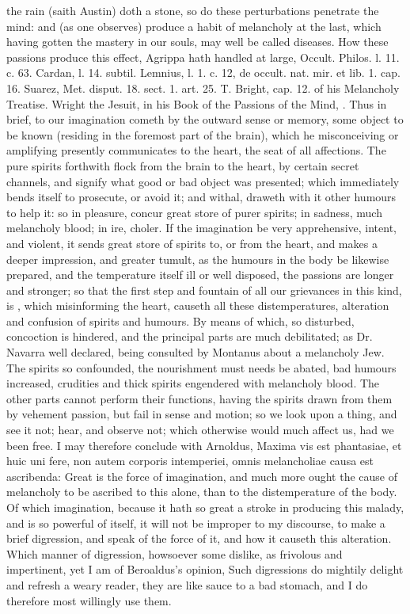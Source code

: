 {the rain (saith Austin) doth a stone, so do these perturbations
penetrate the mind: and (as one observes) produce a habit of
melancholy at the last, which having gotten the mastery in our souls,
may well be called diseases.
How these passions produce this effect, Agrippa hath handled at
large, Occult. Philos. l. 11. c. 63. Cardan, l. 14. subtil. Lemnius, l.
1. c. 12, de occult. nat. mir. et lib. 1. cap. 16. Suarez, Met. disput.
18. sect. 1. art. 25. T. Bright, cap. 12. of his Melancholy Treatise.
Wright the Jesuit, in his Book of the Passions of the Mind, \etc{}. Thus in
brief, to our imagination cometh by the outward sense or memory, some
object to be known (residing in the foremost part of the brain), which
he misconceiving or amplifying presently communicates to the heart, the
seat of all affections. The pure spirits forthwith flock from the brain
to the heart, by certain secret channels, and signify what good or bad
object was presented; which immediately bends itself to
prosecute, or avoid it; and withal, draweth with it other humours to
help it: so in pleasure, concur great store of purer spirits; in
sadness, much melancholy blood; in ire, choler. If the imagination be
very apprehensive, intent, and violent, it sends great store of spirits
to, or from the heart, and makes a deeper impression, and greater
tumult, as the humours in the body be likewise prepared, and the
temperature itself ill or well disposed, the passions are longer and
stronger; so that the first step and fountain of all our grievances in
this kind, is , which misinforming the heart,
causeth all these distemperatures, alteration and confusion of spirits
and humours. By means of which, so disturbed, concoction is hindered,
and the principal parts are much debilitated; as Dr. Navarra well
declared, being consulted by Montanus about a melancholy Jew. The
spirits so confounded, the nourishment must needs be abated, bad
humours increased, crudities and thick spirits engendered with
melancholy blood. The other parts cannot perform their functions,
having the spirits drawn from them by vehement passion, but fail in
sense and motion; so we look upon a thing, and see it not; hear, and
observe not; which otherwise would much affect us, had we been free. I
may therefore conclude with Arnoldus, Maxima vis est phantasiae,
et huic uni fere, non autem corporis intemperiei, omnis melancholiae
causa est ascribenda: Great is the force of imagination, and much more
ought the cause of melancholy to be ascribed to this alone, than to the
distemperature of the body. Of which imagination, because it hath so
great a stroke in producing this malady, and is so powerful of itself,
it will not be improper to my discourse, to make a brief digression,
and speak of the force of it, and how it causeth this alteration. Which
manner of digression, howsoever some dislike, as frivolous and
impertinent, yet I am of Beroaldus's opinion, Such digressions do
mightily delight and refresh a weary reader, they are like sauce to a
bad stomach, and I do therefore most willingly use them.

}
